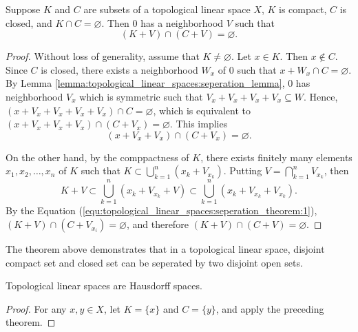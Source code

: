 \begin{thm}
\label{thm:topological_linear_spaces:seperation_theorem}
Suppose $K$ and $C$ are subsets of a topological linear space $X$, $K$ is 
compact, $C$ is closed, and $K \cap C = \varnothing$. 
Then $0$ has a neighborhood $V$ such that 
\begin{equation*}
    (K + V) \cap (C + V) = \varnothing. 
\end{equation*}
\end{thm}
\begin{proof}
Without loss of generality, assume that $K \neq \varnothing$. 
Let $x \in K$. 
Then $x \notin C$. 
Since $C$ is closed, there exists a neighborhood $W_x$ of $0$ such that 
$x + W_x \cap C = \varnothing$. 
By Lemma \ref{lemma:topological_linear_spaces:seperation_lemma}, $0$ has 
neighborhood $V_x$ which is symmetric such that $V_x + V_x + V_x + V_x 
\subseteq W$. 
Hence, $(x + V_x + V_x + V_x + V_x) \cap C = \varnothing$, which is 
equivalent to $(x + V_x + V_x + V_x) \cap (C + V_x) = \varnothing$. 
This implies 
\begin{equation}
    \label{equ:topological_linear_spaces:seperation_theorem:1}
    (x + V_x + V_x) \cap (C + V_x) = \varnothing.
\end{equation} 

On the other hand, by the comppactness of $K$, there exists finitely many 
elements $x_1, x_2, \ldots, x_n$ of $K$ such that $K \subset \bigcup_{k=1}
^n (x_k + V_{x_k})$. 
Putting $V = \bigcap_{k=1}^n V_{x_k}$, then 
\begin{equation*}
    K + V \subset \bigcup_{k=1}^n (x_k + V_{x_k} + V) 
    \subset \bigcup_{k=1}^n (x_k + V_{x_k} + V_{x_k}).
\end{equation*}
By the Equation (\ref{equ:topological_linear_spaces:seperation_theorem:1}), 
$(K + V) \cap (C + V_{x_i}) = \varnothing$, and therefore $(K + V) \cap 
(C + V) = \varnothing$. 
\end{proof}

The theorem above demonstrates that in a topological linear space, disjoint 
compact set and closed set can be seperated by two disjoint open sets. 

\begin{cor}
Topological linear spaces are Hausdorff spaces. 
\end{cor}
\begin{proof}
For any $x, y \in X$, let $K = \{x\}$ and $C = \{y\}$, and apply the 
preceding theorem. 
\end{proof}

